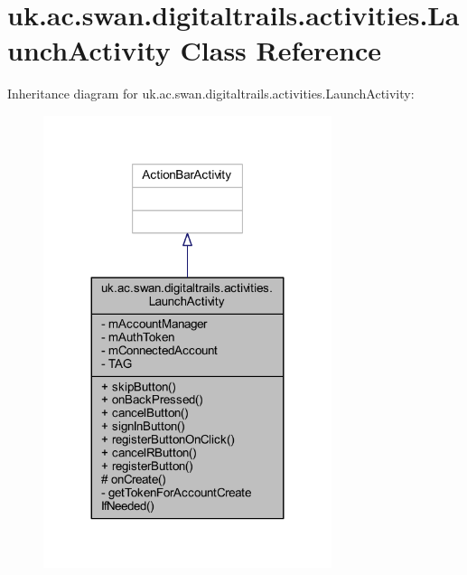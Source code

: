 \hypertarget{classuk_1_1ac_1_1swan_1_1digitaltrails_1_1activities_1_1_launch_activity}{\section{uk.\+ac.\+swan.\+digitaltrails.\+activities.\+Launch\+Activity Class Reference}
\label{classuk_1_1ac_1_1swan_1_1digitaltrails_1_1activities_1_1_launch_activity}
}


Inheritance diagram for uk.\+ac.\+swan.\+digitaltrails.\+activities.\+Launch\+Activity\+:
\nopagebreak
\begin{figure}[H]
\begin{center}
\leavevmode
\includegraphics[width=239pt]{classuk_1_1ac_1_1swan_1_1digitaltrails_1_1activities_1_1_launch_activity__inherit__graph}
\end{center}
\end{figure}



